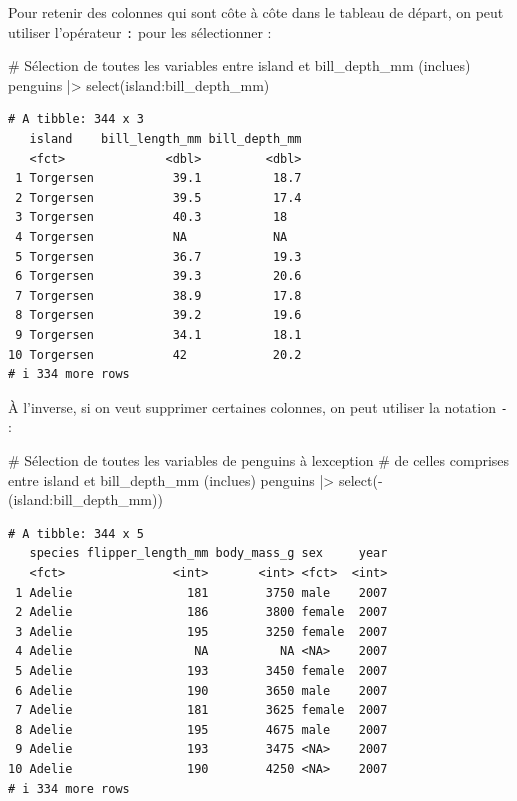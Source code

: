 \documentclass[
  a4paper,
  DIV=11,
  numbers=noendperiod,
  oneside]{scrreprt}
\newenvironment{Shaded}{}{}
\newcommand{\CommentTok}[1]{\textcolor[rgb]{0.42,0.45,0.49}{#1}}
\newcommand{\FunctionTok}[1]{\textcolor[rgb]{0.44,0.26,0.76}{#1}}
\newcommand{\NormalTok}[1]{\textcolor[rgb]{0.14,0.16,0.18}{#1}}
\newcommand{\SpecialCharTok}[1]{\textcolor[rgb]{0.00,0.36,0.77}{#1}}
\begin{document}
Pour retenir des colonnes qui sont côte à côte dans le tableau de
départ, on peut utiliser l'opérateur \texttt{:} pour les sélectionner :

\begin{Shaded}
\begin{Highlighting}[]
\CommentTok{\# Sélection de toutes les variables entre \textasciigrave{}island\textasciigrave{} et \textasciigrave{}bill\_depth\_mm\textasciigrave{} (inclues)}
\NormalTok{penguins }\SpecialCharTok{|\textgreater{}}
  \FunctionTok{select}\NormalTok{(island}\SpecialCharTok{:}\NormalTok{bill\_depth\_mm)}
\end{Highlighting}
\end{Shaded}

\begin{verbatim}
# A tibble: 344 x 3
   island    bill_length_mm bill_depth_mm
   <fct>              <dbl>         <dbl>
 1 Torgersen           39.1          18.7
 2 Torgersen           39.5          17.4
 3 Torgersen           40.3          18  
 4 Torgersen           NA            NA  
 5 Torgersen           36.7          19.3
 6 Torgersen           39.3          20.6
 7 Torgersen           38.9          17.8
 8 Torgersen           39.2          19.6
 9 Torgersen           34.1          18.1
10 Torgersen           42            20.2
# i 334 more rows
\end{verbatim}

À l'inverse, si on veut supprimer certaines colonnes, on peut utiliser
la notation \texttt{-} :

\begin{Shaded}
\begin{Highlighting}[]
\CommentTok{\# Sélection de toutes les variables de \textasciigrave{}penguins\textasciigrave{} à l\textquotesingle{}exception}
\CommentTok{\# de celles comprises entre \textasciigrave{}island\textasciigrave{} et \textasciigrave{}bill\_depth\_mm\textasciigrave{} (inclues)}
\NormalTok{penguins }\SpecialCharTok{|\textgreater{}}
  \FunctionTok{select}\NormalTok{(}\SpecialCharTok{{-}}\NormalTok{(island}\SpecialCharTok{:}\NormalTok{bill\_depth\_mm))}
\end{Highlighting}
\end{Shaded}

\begin{verbatim}
# A tibble: 344 x 5
   species flipper_length_mm body_mass_g sex     year
   <fct>               <int>       <int> <fct>  <int>
 1 Adelie                181        3750 male    2007
 2 Adelie                186        3800 female  2007
 3 Adelie                195        3250 female  2007
 4 Adelie                 NA          NA <NA>    2007
 5 Adelie                193        3450 female  2007
 6 Adelie                190        3650 male    2007
 7 Adelie                181        3625 female  2007
 8 Adelie                195        4675 male    2007
 9 Adelie                193        3475 <NA>    2007
10 Adelie                190        4250 <NA>    2007
# i 334 more rows
\end{verbatim}
\end{document}
